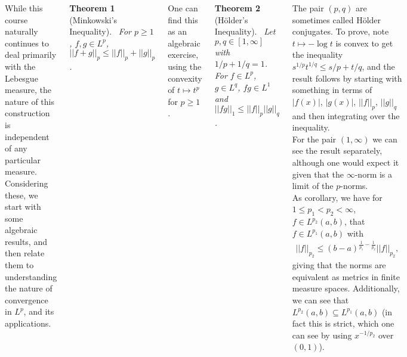 \documentclass{tikzposter} %
\newtheorem{theorem}{Theorem}
\begin{document}
\begin{columns}
{        While this course naturally continues to deal primarily with the Lebesgue measure, the nature of this construction is independent of any particular measure. \\

        Considering these, we start with some algebraic results, and then relate them to understanding the nature of convergence in $L^{p}$, and its applications. \\

        \begin{theorem}[Minkowski's Inequality]
        \ For $p \ge 1$, $f, g \in L^{p}$, $|| f + g||_{p} \le ||f||_{p} + ||g||_{p}$.
        \end{theorem}
        \hphantom{}

        One can find this as an algebraic exercise, using the convexity of $t \mapsto t^{p}$ for $p \ge 1$. \\

        \begin{theorem}[H\"{o}lder's Inequality]
        \ Let $p, q \in [1,\infty]$ with $1/p + 1/q = 1$. For $f \in L^{p}$, $g \in L^{q}$, $fg \in L^{1}$ and $||fg||_{1} \le ||f||_{p} ||g||_{q}$.
        \end{theorem}
        \hphantom{}

        The pair $(p,q)$ are sometimes called H\"{o}lder conjugates. To prove, note $t \mapsto - \log t$ is convex to get the inequality $s^{1/p}t^{1/q} \le s/p + t/q$, and the result follows by starting with something in terms of $|f(x)|$, $|g(x)|$, $||f||_{p}$, $||g||_{q}$ and then integrating over the inequality. \\

        For the pair $(1,\infty)$ we can see the result separately, although one would expect it given that the $\infty$-norm is a limit of the $p$-norms. \\

        As corollary, we have for $1 \le p_{1} < p_{2} < \infty$, $f \in L^{p_{2}}(a,b)$, that $f \in L^{p_{1}}(a,b)$ with
        \begin{align*}
          ||f||_{p_{2}} \le (b-a)^{\frac{1}{p_{1}} - \frac{1}{p_{2}}} ||f||_{p_{2}},
        \end{align*}
        giving that the norms are equivalent as metrics in finite measure spaces. Additionally, we can see that $L^{p_{2}}(a,b) \subseteq L^{p_{1}}(a,b)$ (in fact this is strict, which one can see by using $x^{-1/p_{2}}$ over $(0,1)$). \\

}
\end{columns}
\end{document}
